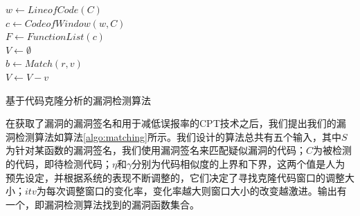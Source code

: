 \begin{algorithm}[htbp]
	\small
    $w \leftarrow LineofCode(C)$ \\
    $c \leftarrow CodeofWindow(w,C)$ \\
    $F \leftarrow FunctionList(c)$ \\
    $V \leftarrow \emptyset$ \\
     {
    }
     {
         {
            $b \leftarrow Match(r, v)$ \\
             {
                $V \leftarrow V - v$ \\
            }
        }
    }
	\caption{基于代码克隆分析的漏洞检测算法}\label{algo:matching}
\end{algorithm}


在获取了漏洞的漏洞签名和用于减低误报率的CPT技术之后，我们提出我们的漏洞检测算法如算法\ref{algo:matching}所示。我们设计的算法总共有五个输入，其中$S$为针对某函数的漏洞签名，我们使用漏洞签名来匹配疑似漏洞的代码；$C$为被检测的代码，即待检测代码；$\eta$和$\gamma$分别为代码相似度的上界和下界，这两个值是人为预先设定，并根据系统的表现不断调整的，它们决定了寻找克隆代码窗口的调整大小；$itv$为每次调整窗口的变化率，变化率越大则窗口大小的改变越激进。输出有一个，即漏洞检测算法找到的漏洞函数集合。

